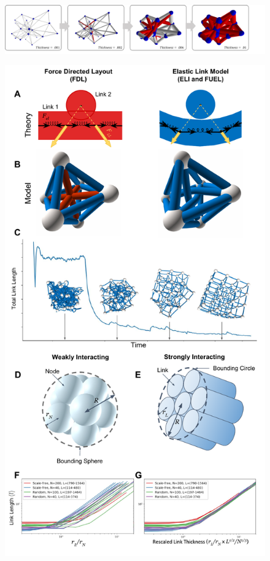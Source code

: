 \documentclass[linenumbers,endfloats,nofootinbib,preprint,floatfix,titlepage,superscriptaddress]{revtex4-1} %
\begin{document}
\linespread{1.5}
\begin{figure}
    \centering
    \includegraphics[width=\columnwidth]{fig-09-19/red-conf.png}
\end{figure}
\begin{figure}
    \centering
    \includegraphics[width=.68\columnwidth, trim=0 1cm 0 4.5cm]{fig-09-19/3d-crs-lat-trans-112017.pdf}

\end{figure}
\end{document}
